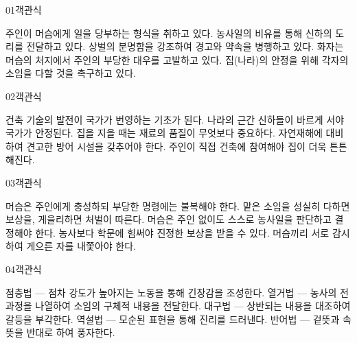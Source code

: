\documentclass[fs85,seriesWit]{korfarm-base}
\begin{document}
\kfBeginMC
\begin{kfQBlock}{01}{객관식}
\begin{kfChoices}
\kfChoice 주인이 머슴에게 일을 당부하는 형식을 취하고 있다.
\kfChoice 농사일의 비유를 통해 신하의 도리를 전달하고 있다.
\kfChoice 상벌의 분명함을 강조하여 경고와 약속을 병행하고 있다.
\kfChoice 화자는 머슴의 처지에서 주인의 부당한 대우를 고발하고 있다.
\kfChoice 집(나라)의 안정을 위해 각자의 소임을 다할 것을 촉구하고 있다.
\end{kfChoices}
\end{kfQBlock}

\begin{kfQBlock}{02}{객관식}
\begin{kfChoices}
\kfChoice 건축 기술의 발전이 국가가 번영하는 기초가 된다.
\kfChoice 나라의 근간 신하들이 바르게 서야 국가가 안정된다.
\kfChoice 집을 지을 때는 재료의 품질이 무엇보다 중요하다.
\kfChoice 자연재해에 대비하여 견고한 방어 시설을 갖추어야 한다.
\kfChoice 주인이 직접 건축에 참여해야 집이 더욱 튼튼해진다.
\end{kfChoices}
\end{kfQBlock}

\begin{kfQBlock}{03}{객관식}
\begin{kfChoices}
\kfChoice 머슴은 주인에게 충성하되 부당한 명령에는 불복해야 한다.
\kfChoice 맡은 소임을 성실히 다하면 보상을, 게을리하면 처벌이 따른다.
\kfChoice 머슴은 주인 없이도 스스로 농사일을 판단하고 결정해야 한다.
\kfChoice 농사보다 학문에 힘써야 진정한 보상을 받을 수 있다.
\kfChoice 머슴끼리 서로 감시하여 게으른 자를 내쫓아야 한다.
\end{kfChoices}
\end{kfQBlock}

\begin{kfQBlock}{04}{객관식}
\begin{kfChoices}
\kfChoice 점층법 — 점차 강도가 높아지는 노동을 통해 긴장감을 조성한다.
\kfChoice 열거법 — 농사의 전 과정을 나열하여 소임의 구체적 내용을 전달한다.
\kfChoice 대구법 — 상반되는 내용을 대조하여 갈등을 부각한다.
\kfChoice 역설법 — 모순된 표현을 통해 진리를 드러낸다.
\kfChoice 반어법 — 겉뜻과 속뜻을 반대로 하여 풍자한다.
\end{kfChoices}
\end{kfQBlock}
\end{document}
